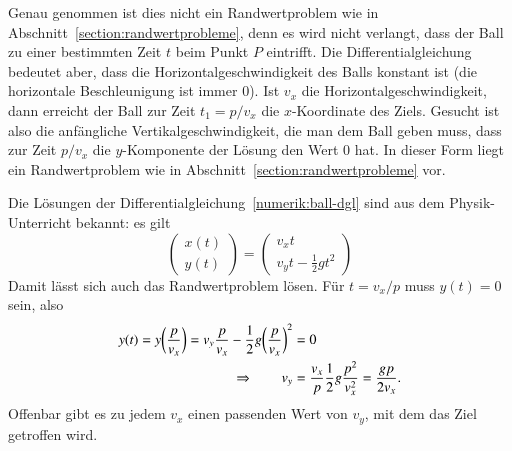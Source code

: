 Genau genommen ist dies nicht ein Randwertproblem wie in 
Abschnitt~\ref{section:randwertprobleme}, denn es wird nicht verlangt,
dass der Ball zu einer bestimmten Zeit $t$ beim Punkt $P$ eintrifft.
Die Differentialgleichung bedeutet aber, dass die Horizontalgeschwindigkeit
des Balls konstant ist (die horizontale Beschleunigung ist immer $0$).
%
Ist $v_x$ die Horizontalgeschwindigkeit, dann erreicht der Ball zur
Zeit $t_1=p/v_x$ die $x$-Koordinate des Ziels.
Gesucht ist also die anfängliche Vertikalgeschwindigkeit, die man
dem Ball geben muss, dass zur Zeit $p/v_x$ die $y$-Komponente
der Lösung den Wert $0$ hat.
%
In dieser Form liegt ein Randwertproblem wie in
Abschnitt~\ref{section:randwertprobleme} vor.

Die Lösungen der Differentialgleichung~\ref{numerik:ball-dgl} sind aus
dem Physik-Unterricht bekannt:
%
es gilt
\begin{equation}
\begin{pmatrix}x(t)\\y(t)\end{pmatrix}
=
\begin{pmatrix}v_xt\\ v_yt-\frac12gt^2\end{pmatrix}
\end{equation}
Damit lässt sich auch das Randwertproblem lösen.
Für $t=v_x/p$ muss $y(t)=0$ sein, also
\begin{align}
y(t)=y\biggl(\frac{p}{v_x}\biggr)
=v_y\frac{p}{v_x}-\frac12g\biggl(\frac{p}{v_x}\biggr)^2&=0
\notag
\\
\Rightarrow\qquad
v_y
&=
\frac{v_x}p\frac12g\frac{p^2}{v_x^2}=\frac{gp}{2v_x}.
\label{numerik:ball-bedingung}
\end{align}
Offenbar gibt es zu jedem $v_x$ einen passenden Wert von $v_y$,
mit dem das Ziel getroffen wird.

